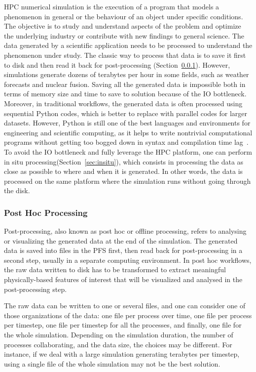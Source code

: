 HPC numerical simulation is the execution of a program that models a phenomenon in general or the behaviour of an object under specific conditions. The objective is to study and understand aspects of the problem and optimize the underlying industry or contribute with new findings to general science.  The data generated by a scientific application needs to be processed  to understand the phenomenon under study. The classic way to process that data is to save it first to disk and then read it back for post-processing (Section~\ref{sec:posthoc}). 
However, simulations generate dozens of terabytes per hour in some fields, such as weather forecasts and nuclear fusion. Saving all the generated data is impossible both in terms of memory size and time to save to solution because of the IO bottleneck. Moreover, in traditional workflows, the generated data is often processed using sequential Python codes, which is better to replace with parallel codes for larger datasets. However, Python is still one of the best languages and environments for engineering and scientific computing, as it helps to write nontrivial computational programs without getting too bogged down in syntax and compilation time lag~\cite{4160250_python_for_scientific_computing}.
To avoid the IO bottleneck and fully leverage the HPC platform, one can perform in situ processing(Section~\ref{sec:insitu}), which consists in processing the data as close as possible to where and when it is generated. In other words, the data is processed on the same platform where the simulation runs without going through the disk.

\subsubsection{Post Hoc Processing}\label{sec:posthoc}

Post-processing, also known as post hoc or offline processing, refers to analysing or visualizing the generated data at the end of the simulation. The generated data is saved into files in the PFS first, then read back for post-processing in a second step, usually in a separate computing environment. 
In post hoc workflows, the raw data written to disk has to be transformed to extract meaningful physically-based features of interest that will be visualized and analysed in the post-processing step.  

The raw data can be written to one or several files, and one can consider one of those organizations of the data: one file per process over time, one file per process per timestep,  one file per timestep for all the processes, and finally, one file for the whole simulation. Depending on the simulation duration, the number of processes collaborating, and the data size, the choices may be different. For instance, if we deal with a large simulation generating terabytes per timestep, using a single file of the whole simulation may not be the best solution. 

